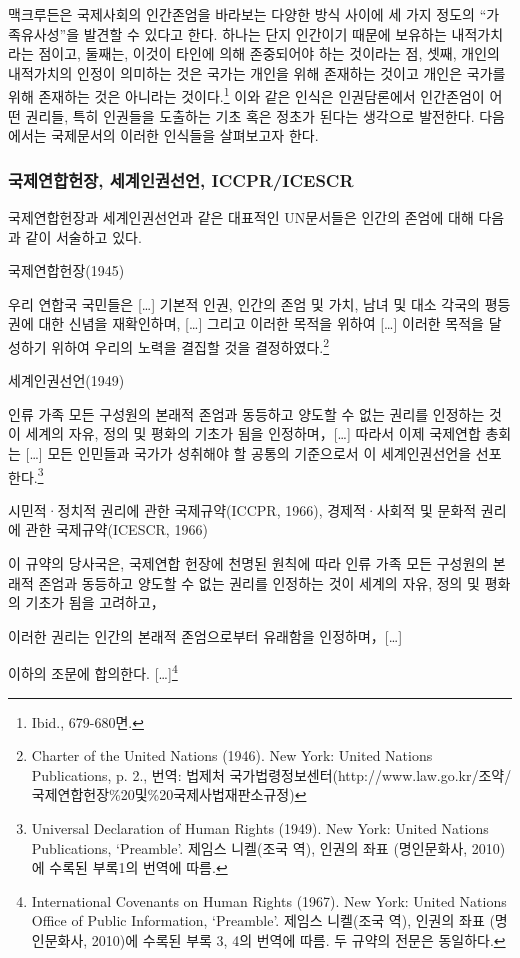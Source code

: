 맥크루든은 국제사회의 인간존엄을 바라보는 다양한 방식 사이에 세 가지 정도의 ``가족유사성''을 발견할 수 있다고 한다. 하나는 단지 인간이기 때문에 보유하는 내적가치라는 점이고, 둘째는, 이것이 타인에 의해 존중되어야 하는 것이라는 점, 셋째, 개인의 내적가치의 인정이 의미하는 것은 국가는 개인을 위해 존재하는 것이고 개인은 국가를 위해 존재하는 것은 아니라는 것이다.\footnote{Ibid., 679-680면.} 이와 같은 인식은 인권담론에서 인간존엄이 어떤 권리들, 특히 인권들을 도출하는 기초 혹은 정초가 된다는 생각으로 발전한다. 다음에서는 국제문서의 이러한 인식들을 살펴보고자 한다.

\subsubsection{국제연합헌장, 세계인권선언, ICCPR/ICESCR}

국제연합헌장과 세계인권선언과 같은 대표적인 UN문서들은 인간의 존엄에 대해 다음과 같이 서술하고 있다.

\begin{displayquote}
국제연합헌장(1945)

우리 연합국 국민들은 {[}\ldots{]} 기본적 인권, 인간의 존엄 및 가치, 남녀 및 대소 각국의 평등권에 대한 신념을 재확인하며, {[}\ldots{]} 그리고 이러한 목적을 위하여 {[}\ldots{]} 이러한 목적을 달성하기 위하여 우리의 노력을 결집할 것을 결정하였다.\footnote{Charter of the United Nations (1946). New York: United Nations Publications, p. 2., 번역: 법제처 국가법령정보센터(http://www.law.go.kr/조약/국제연합헌장\%20및\%20국제사법재판소규정)}

세계인권선언(1949)

인류 가족 모든 구성원의 본래적 존엄과 동등하고 양도할 수 없는 권리를 인정하는 것이 세계의 자유, 정의 및 평화의 기초가 됨을 인정하며，{[}\ldots{]} 따라서 이제 국제연합 총회는 {[}\ldots{]} 모든 인민들과 국가가 성취해야 할 공통의 기준으로서 이 세계인권선언을 선포한다.\footnote{Universal Declaration of Human Rights (1949). New York: United Nations Publications, `Preamble'. 제임스 니켈(조국 역), 인권의 좌표 (명인문화사, 2010)에 수록된 부록1의 번역에 따름.}

시민적·정치적 권리에 관한 국제규약(ICCPR, 1966), 경제적·사회적 및 문화적 권리에 관한 국제규약(ICESCR, 1966)

이 규약의 당사국은, 국제연합 헌장에 천명된 원칙에 따라 인류 가족 모든 구성원의 본래적 존엄과 동등하고 양도할 수 없는 권리를 인정하는 것이 세계의 자유, 정의 및 평화의 기초가 됨을 고려하고，

이러한 권리는 인간의 본래적 존엄으로부터 유래함을 인정하며，{[}\ldots{]}

이하의 조문에 합의한다. {[}\ldots{]}\footnote{International Covenants on Human Rights (1967). New York: United Nations Office of Public Information, `Preamble'. 제임스 니켈(조국 역), 인권의 좌표 (명인문화사, 2010)에 수록된 부록 3, 4의 번역에 따름. 두 규약의 전문은 동일하다.}
\end{displayquote}


